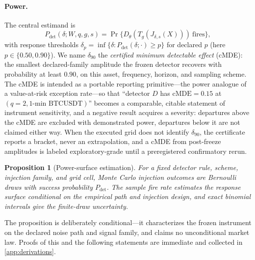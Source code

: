 \documentclass[3p]{elsarticle}
\newtheorem{proposition}{Proposition}
\newcommand{\Pdet}{\ensuremath{P_{\mathrm{det}}}}
\begin{document}
\paragraph{Power.} The central estimand is
\begin{equation}
  \Pdet(\delta;W,q,g,s)
  =
  \Pr\{D_\theta(T_g(J_{\delta,s}(X)))\ \text{fires}\},
  \label{eq:pdet}
\end{equation}
with response thresholds
$\delta_p=\inf\{\delta : \Pdet(\delta;\cdot)\ge p\}$ for declared $p$
(here $p\in\{0.50,0.90\}$). We name $\delta_{90}$ the \emph{certified minimum
detectable effect} (cMDE): the smallest declared-family amplitude the frozen
detector recovers with probability at least $0.90$, on this asset, frequency,
horizon, and sampling scheme. The cMDE is intended as a portable reporting
primitive---the power analogue of a value-at-risk exception rate---so that
``detector $D$ has $\mathrm{cMDE}=0.15$ at $(q{=}2, \text{1-min BTCUSDT})$''
becomes a comparable, citable statement of instrument sensitivity, and a
negative result acquires a severity: departures above the cMDE are excluded
with demonstrated power, departures below it are not claimed either way. When
the executed grid does not identify $\delta_{90}$, the certificate reports a
bracket, never an extrapolation, and a cMDE from post-freeze amplitudes is
labeled exploratory-grade until a preregistered confirmatory rerun.

\begin{proposition}[Power-surface estimation]
\label{prop:power}
For a fixed detector rule, scheme, injection family, and grid cell, Monte
Carlo injection outcomes are Bernoulli draws with success probability
$\Pdet$. The sample fire rate estimates the response surface conditional on
the empirical path and injection design, and exact binomial intervals give
the finite-draw uncertainty.
\end{proposition}

The proposition is deliberately conditional---it characterizes the frozen
instrument on the declared noise path and signal family, and claims no
unconditional market law. Proofs of this and the following statements are
immediate and collected in \ref{app:derivations}.
\end{document}
